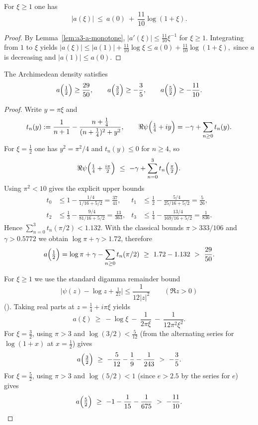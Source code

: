 \begin{lemma}\label{lem:a3-a-log}
For $\xi\ge 1$ one has
\[
  |a(\xi)|\ \le\ a(0)\ +\ \frac{11}{10}\log(1+\xi).
\]
\end{lemma}
\begin{proof}
By Lemma~\ref{lem:a3-a-monotone}, $|a'(\xi)|\le \frac{11}{10}\xi^{-1}$ for $\xi\ge1$.
Integrating from $1$ to $\xi$ yields
\(
  |a(\xi)|\le |a(1)|+\frac{11}{10}\log\xi\le a(0)+\frac{11}{10}\log(1+\xi),
\)
since $a$ is decreasing and $|a(1)|\le a(0)$.
\end{proof}


\begin{lemma}\label{lem:a3-a-sample}
The Archimedean density satisfies
\[
  a\Bigl(\tfrac12\Bigr)\ge \frac{29}{50},\qquad
  a\Bigl(\tfrac32\Bigr)\ge -\frac{3}{5},\qquad
  a\Bigl(\tfrac52\Bigr)\ge -\frac{11}{10}.
\]
\end{lemma}
\begin{proof}
Write $y=\pi\xi$ and
\[
  t_n(y):=\frac{1}{n+1}-\frac{n+\tfrac14}{(n+\tfrac14)^2+y^2},\qquad
  \Re\psi\Bigl(\tfrac14+i y\Bigr)=-\gamma+\sum_{n\ge0}t_n(y).
\]
For $\xi=\tfrac12$ one has $y^2=\pi^2/4$ and $t_n(y)\le0$ for $n\ge4$, so
\[
  \Re\psi\Bigl(\tfrac14+\tfrac{i\pi}{2}\Bigr)\ \le\ -\gamma+\sum_{n=0}^{3}t_n\Bigl(\tfrac{\pi}{2}\Bigr).
\]
Using $\pi^2<10$ gives the explicit upper bounds
\begin{align*}
  t_0 &\le 1-\frac{1/4}{1/16+5/2}=\frac{37}{41},&
  t_1 &\le \frac12-\frac{5/4}{25/16+5/2}=\frac{5}{26},\\
  t_2 &\le \frac13-\frac{9/4}{81/16+5/2}=\frac{13}{363},&
  t_3 &\le \frac14-\frac{13/4}{169/16+5/2}=\frac{1}{836}.
\end{align*}
Hence $\sum_{n=0}^{3}t_n(\pi/2)<1.132$. With the classical bounds
$\pi>333/106$ and $\gamma>0.5772$ we obtain $\log\pi+\gamma>1.72$, therefore
\[
  a\Bigl(\tfrac12\Bigr)=\log\pi+\gamma-\sum_{n\ge0}t_n(\pi/2)\ \ge\ 1.72-1.132\ >\ \frac{29}{50}.
\]

For $\xi\ge1$ we use the standard digamma remainder bound
\[
  \bigl|\psi(z)-\log z+\tfrac{1}{2z}\bigr|\le \frac{1}{12|z|^2}\qquad(\Re z>0)
\]
(\cite[\S5.11]{NISTDLMF}). Taking real parts at $z=\tfrac14+i\pi\xi$ yields
\[
  a(\xi)\ \ge\ -\log\xi\ -\ \frac{1}{2\pi\xi}\ -\ \frac{1}{12\pi^2\xi^2}.
\]
For $\xi=\tfrac32$, using $\pi>3$ and $\log(3/2)<\tfrac{5}{12}$ (from the alternating series for $\log(1+x)$ at $x=\tfrac12$) gives
\[
  a\Bigl(\tfrac32\Bigr)\ \ge\ -\frac{5}{12}-\frac{1}{9}-\frac{1}{243}\ >\ -\frac{3}{5}.
\]
For $\xi=\tfrac52$, using $\pi>3$ and $\log(5/2)<1$ (since $e>2.5$ by the series for $e$) gives
\[
  a\Bigl(\tfrac52\Bigr)\ \ge\ -1-\frac{1}{15}-\frac{1}{675}\ >\ -\frac{11}{10}.
\]
\end{proof}

